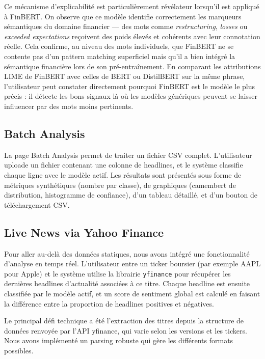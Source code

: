 \documentclass[12pt, a4paper]{article}
\begin{document}
Ce mécanisme d'explicabilité est particulièrement révélateur lorsqu'il est appliqué
à FinBERT. On observe que ce modèle identifie correctement les marqueurs sémantiques
du domaine financier --- des mots comme \textit{restructuring}, \textit{losses} ou
\textit{exceeded expectations} reçoivent des poids élevés et cohérents avec leur
connotation réelle. Cela confirme, au niveau des mots individuels, que FinBERT
ne se contente pas d'un pattern matching superficiel mais qu'il a bien intégré
la sémantique financière lors de son pré-entraînement. En comparant les attributions
LIME de FinBERT avec celles de BERT ou DistilBERT sur la même phrase, l'utilisateur
peut constater directement pourquoi FinBERT est le modèle le plus précis : il
détecte les bons signaux là où les modèles génériques peuvent se laisser influencer
par des mots moins pertinents.

\subsection{Batch Analysis}

La page Batch Analysis permet de traiter un fichier CSV complet. L'utilisateur
uploade un fichier contenant une colonne de headlines, et le système classifie
chaque ligne avec le modèle actif. Les résultats sont présentés sous forme de
métriques synthétiques (nombre par classe), de graphiques (camembert de distribution,
histogramme de confiance), d'un tableau détaillé, et d'un bouton de téléchargement
CSV.

\subsection{Live News via Yahoo Finance}

Pour aller au-delà des données statiques, nous avons intégré une fonctionnalité
d'analyse en temps réel. L'utilisateur entre un ticker boursier (par exemple AAPL
pour Apple) et le système utilise la librairie \texttt{yfinance} pour récupérer les
dernières headlines d'actualité associées à ce titre. Chaque headline est ensuite
classifiée par le modèle actif, et un score de sentiment global est calculé en
faisant la différence entre la proportion de headlines positives et négatives.

Le principal défi technique a été l'extraction des titres depuis la structure de
données renvoyée par l'API yfinance, qui varie selon les versions et les tickers.
Nous avons implémenté un parsing robuste qui gère les différents formats possibles.
\end{document}

